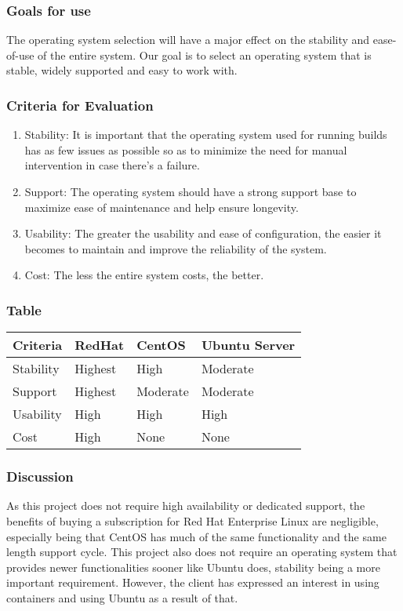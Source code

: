 \documentclass[10pt,letterpaper,onecolumn,draftclsnofoot]{IEEEtran}
\begin{document}
\subsubsection{Goals for use}
The operating system  selection will have a major effect on the stability and ease-of-use of the entire system. Our goal is to select an operating system that is stable, widely supported and easy to work with.
\subsubsection{Criteria for Evaluation}
\begin{enumerate}
  \item Stability: It is important that the operating system used for running builds has as few issues as possible so as to minimize the need for manual intervention in case there's a failure.
  \item Support: The operating system should have a strong support base to maximize ease of maintenance and help ensure longevity.
  \item Usability: The greater the usability and ease of configuration, the easier it becomes to maintain and improve the reliability of the system.
  \item Cost: The less the entire system costs, the better.
\end{enumerate}
\subsubsection{Table}
\begin{center}
  \begin{tabular}{llll}
    Criteria & RedHat & CentOS & Ubuntu Server \\ \midrule
    Stability       & Highest & High & Moderate \\ \midrule
    Support           & Highest & Moderate & Moderate \\ \midrule
    Usability       & High & High & High \\ \midrule
    Cost       & High & None & None \\ \bottomrule
  \end{tabular}
\end{center}
\subsubsection{Discussion}
As this project does not require high availability or dedicated support, the benefits of buying a subscription for Red Hat Enterprise Linux are negligible, especially being that CentOS has much of the same functionality and the same length support cycle. This project also does not require an operating system that provides newer functionalities sooner like Ubuntu does, stability being a more important requirement. However, the client has expressed an interest in using containers and using Ubuntu as a result of that.
\end{document}
